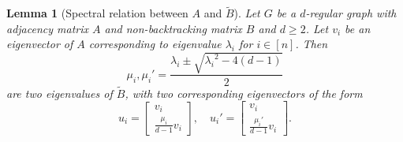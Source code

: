 \documentclass[11pt,reqno]{amsart}
\newtheorem{lemma}[theorem]{Lemma}
\theoremstyle{definition}
\begin{document}
\begin{lemma}[Spectral relation between $A$ and $\tilde B$]\label{lem:eiganvalues}
Let $G$ be a $d$-regular graph with adjacency matrix $A$ and non-backtracking matrix $B$ and $d\geq 2$.
Let $v_i$ be an eigenvector of $A$ corresponding to {eigenvalue} $\lambda_i $ for $ i\in [n]$.  
Then
\begin{equation}
    \mu_i, \mu_i' = \frac{\lambda_i \pm \sqrt{{\lambda_i}^2-4(d-1)}}{2}
\end{equation}
are two eigenvalues of $\tilde B$, with two corresponding eigenvectors of the form  
\begin{equation}\label{eq:eigenvectortb}
u_i = 
    \begin{bmatrix}
v_i\\
 \frac{\mu_i}{d-1} v_i
\end{bmatrix}  ,\quad u_i' = 
    \begin{bmatrix}
v_i\\
 \frac{\mu_i'}{d-1} v_i
\end{bmatrix} .
\end{equation}
\end{lemma}
\end{document}
